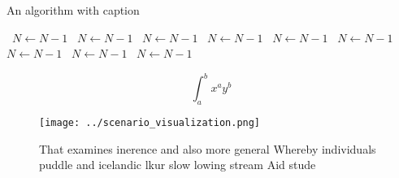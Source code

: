 \documentclass[a4paper]{article}
\begin{document}
\begin{algorithm}
\caption{An algorithm with caption}
\begin{algorithmic}
\    \State $N \gets N - 1$
\    \State $N \gets N - 1$
\    \State $N \gets N - 1$
\    \State $N \gets N - 1$
\    \State $N \gets N - 1$
\    \State $N \gets N - 1$
\    \State $N \gets N - 1$
\    \State $N \gets N - 1$
\    \State $N \gets N - 1$
\EndWhile
\end{algorithmic}
\end{algorithm}

\[ \int_{a}^{b}{x^{a}y^{b}} \]

\begin{figure}
\centering
\texttt{[image: ../scenario\_visualization.png]}
\caption{That examines inerence and also more general Whereby individuals puddle and icelandic lkur slow lowing stream Aid stude
}
\end{figure}
 
\end{document}
